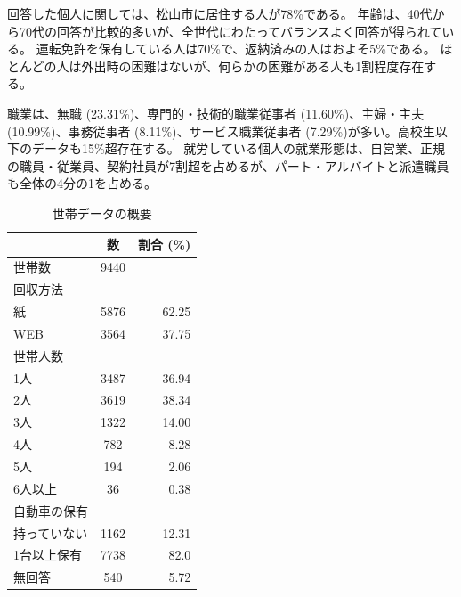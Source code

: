 \documentclass[a4paper,12pt, uplatex]{jsbook}
\begin{document}
回答した個人に関しては、松山市に居住する人が78\%である。
年齢は、40代から70代の回答が比較的多いが、全世代にわたってバランスよく回答が得られている。
運転免許を保有している人は70\%で、返納済みの人はおよそ5\%である。
ほとんどの人は外出時の困難はないが、何らかの困難がある人も1割程度存在する。

職業は、無職 (23.31\%)、専門的・技術的職業従事者 (11.60\%)、主婦・主夫 (10.99\%)、事務従事者 (8.11\%)、サービス職業従事者 (7.29\%)が多い。高校生以下のデータも15\%超存在する。
就労している個人の就業形態は、自営業、正規の職員・従業員、契約社員が7割超を占めるが、パート・アルバイトと派遣職員も全体の4分の1を占める。

\begin{table}[h]
    \centering
    \caption{世帯データの概要}
    \begin{tabular}{lcr}
        \toprule
        & 数 & 割合 (\%) \\
        \midrule
        世帯数 & 9440 & \\

        回収方法 & & \\
        \hspace{1em} 紙 & 5876 & 62.25 \\
        \hspace{1em} WEB & 3564 & 37.75 \\


        世帯人数 & & \\
        \hspace{1em}1人 & 3487 & 36.94 \\
        \hspace{1em}2人 & 3619 & 38.34 \\
        \hspace{1em}3人 & 1322 & 14.00 \\
        \hspace{1em}4人 & 782 & 8.28 \\
        \hspace{1em}5人 & 194 & 2.06 \\
        \hspace{1em}6人以上 & 36 & 0.38 \\

        自動車の保有 & & \\
        \hspace{1em} 持っていない & 1162 & 12.31 \\
        \hspace{1em} 1台以上保有 & 7738 & 82.0 \\
        \hspace{1em} 無回答 & 540 & 5.72 \\


\end{tabular}
\end{table}
\end{document}
